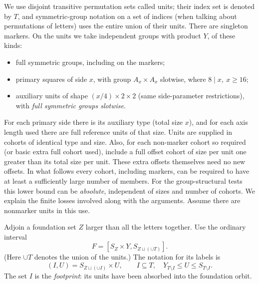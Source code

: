 \begin{definition}\label{t:weighted-units}
We use disjoint transitive permutation sets called units; their index set is denoted by \(T\), and
symmetric-group notation on a set of indices (when talking about permutations of letters) uses the
entire union of their units. There are singleton markers. On the units we take independent groups
with product \(Y\), of these kinds:
\begin{itemize}
\item full symmetric groups, including on the markers;
\item primary squares of side \(x\), with group \(A_x\times A_x\) slotwise, where \(8\mid x,\ x\ge16\);
\item auxiliary units of shape \((x/4)\times2\times2\) (same side-parameter restrictions), with \emph{full symmetric groups slotwise}.
\end{itemize}

For each primary side there is its auxiliary type (total size \(x\)), and for each axis length
used there are full reference units of that size. Units are supplied in cohorts of identical type
and size. Also, for each non-marker cohort so required (or basic extra full cohort used), include
a full offset cohort of size per unit one greater than its total size per unit. These extra
offsets themselves need no new offsets. In what follows every cohort, including markers, can be
required to have at least a sufficiently large number of members. For the group-structural tests
this lower bound can be \emph{absolute}, independent of sizes and number of cohorts. We explain
the finite losses involved along with the arguments. Assume there are nonmarker units in this use.
\end{definition}

\begin{definition}\label{t:weighted-template}
Adjoin a foundation set \(Z\) larger than all the letters together. Use the ordinary interval
\[
       F=[S_Z\times Y,S_{Z\sqcup(\cup T)}].
\]
(Here \(\cup T\) denotes the union of the units.) The notation for its labels is
\[
       (I,U)=S_{Z\sqcup(\cup I)}\times U,\qquad
       I\subseteq T,\quad Y_{T\setminus I}\le U\le S_{T\setminus I}.
\]
The set \(I\) is the \emph{footprint}: its units have been absorbed into the foundation orbit.
\end{definition}

